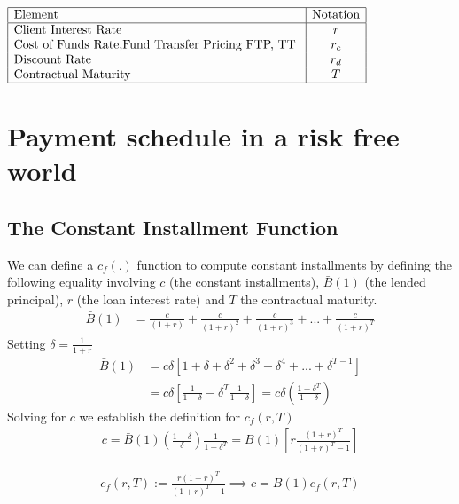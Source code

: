 \renewcommand{\arraystretch}{1.5} %
\begin{center} %
\begin{math} %
\begin{array}{|l|c|l|} \hline %
\mbox{Element} & \mbox{Notation}\\ \hline
\mbox{Client Interest Rate}  & r \\
\mbox{Cost of Funds Rate,Fund Transfer Pricing FTP, TT   }  & r_c \\
\mbox{Discount Rate }  & r_d\\
\mbox{Contractual Maturity }  & T \\
\hline
\end{array} %
\end{math}%
\end{center}



\section{Payment schedule in a risk free world}
\subsection{The Constant Installment Function}
We can define a $c_f(.)$ function to compute constant installments by defining the following equality involving $c$ (the constant installments), $\bar{B}(1)$ (the lended principal), $r$ (the loan interest rate) and $T$ the contractual maturity.
\begin{align}
    \bar{B}(1) &= \frac{c}{(1+r)}+\frac{c}{(1+r)^2}+\frac{c}{(1+r)^3}+...+\frac{c}{(1+r)^T}
\end{align}
Setting $\delta=\frac{1}{1+r}$
\begin{align}
    \bar{B}(1) &=c\delta[1+\delta+\delta^2+\delta^3+\delta^4+...+\delta^{T-1}] \nonumber \\
    &=c\delta\left[\frac{1}{1-\delta}-\delta^T\frac{1}{1-\delta}\right] =c\delta\left(\frac{1-\delta^T}{1-\delta}\right)
\end{align}
Solving for $c$ we establish the definition for $c_f(r,T)$
\begin{align}
    c=\bar{B}(1)\left(\frac{1-\delta}{\delta}\right)\frac{1}{1-\delta^T}=B(1)\left[r\frac{(1+r)^T}{(1+r)^T-1}\right]
\end{align}

\begin{align}
    \boxed{c_f(r,T):=\frac{r(1+r)^T}{(1+r)^T-1}} \implies c=\bar{B}(1)c_f(r,T) \label{eq:c}
\end{align}
